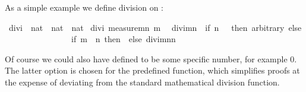 \begin{isabellebody}
\begin{isamarkuptext}
As a simple example we define division on :%
\end{isamarkuptext}%
\ divi\ {\isacharcolon}{\isacharcolon}\ {\isachardoublequote}nat\ {\isasymtimes}\ nat\ {\isasymRightarrow}\ nat{\isachardoublequote}\isanewline
{}\ divi\ {\isachardoublequote}measure{\isacharparenleft}{\isasymlambda}{\isacharparenleft}m{\isacharcomma}n{\isacharparenright}{\isachardot}\ m{\isacharparenright}{\isachardoublequote}\isanewline
\ \ {\isachardoublequote}divi{\isacharparenleft}m{\isacharcomma}n{\isacharparenright}\ {\isacharequal}\ {\isacharparenleft}if\ n\ {\isacharequal}\ {}\ then\ arbitrary\ else\isanewline
\ \ \ \ \ \ \ \ \ \ \ \ \ \ \ \ if\ m\ {\isacharless}\ n\ then\ {}\ else\ divi{\isacharparenleft}m{\isacharminus}n{\isacharcomma}n{\isacharparenright}{\isacharplus}{}{\isacharparenright}{\isachardoublequote}%
\begin{isamarkuptext}%
\noindent Of course we could also have defined
 to be some specific number, for example 0. The
latter option is chosen for the predefined  function, which
simplifies proofs at the expense of deviating from the
standard mathematical division function.


\end{isamarkuptext}
\end{isabellebody}
